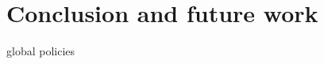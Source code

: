 \documentclass[conference]{IEEEtran}
\begin{document}
\section{Conclusion and future work}\label{sec:conclusion}

global policies




\end{document}
